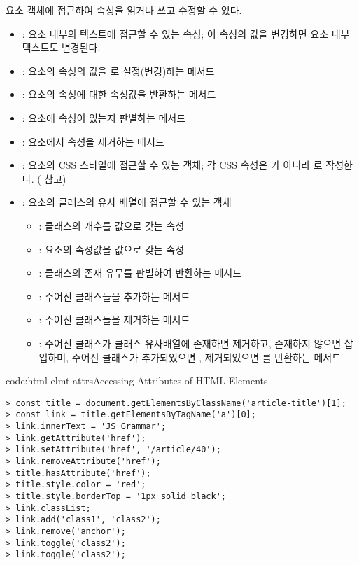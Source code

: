 요소 객체에 접근하여 속성을 읽거나 쓰고 수정할 수 있다.

\begin{itemize}
    \item {}: 요소 내부의 텍스트에 접근할 수 있는 속성; 이 속성의 값을 변경하면 요소 내부 텍스트도 변경된다.
    \item {}: 요소의  속성의 값을 로 설정(변경)하는 메서드
    \item {}: 요소의  속성에 대한 속성값을 반환하는 메서드
    \item {}: 요소에  속성이 있는지 판별하는 메서드
    \item {}: 요소에서  속성을 제거하는 메서드
    \item {}: 요소의 CSS 스타일에 접근할 수 있는 객체; 각 CSS 속성은 가 아니라 로 작성한다. ( 참고)
    \item {}: 요소의 클래스의 유사 배열에 접근할 수 있는 객체
    \begin{itemize}
        \item {}: 클래스의 개수를 값으로 갖는 속성
        \item {}: 요소의  속성값을 값으로 갖는 속성
        \item {}: 클래스의 존재 유무를 판별하여 반환하는 메서드
        \item {}: 주어진 클래스들을 추가하는 메서드
        \item {}: 주어진 클래스들을 제거하는 메서드
        \item {}: 주어진 클래스가 클래스 유사배열에 존재하면 제거하고, 존재하지 않으면 삽입하며, 주어진 클래스가 추가되었으면 , 제거되었으면 를 반환하는 메서드
    \end{itemize}
\end{itemize}

\begin{codeenv}{code:html-elmt-attrs}{Accessing Attributes of HTML Elements}\begin{verbatim}
> const title = document.getElementsByClassName('article-title')[1];
> const link = title.getElementsByTagName('a')[0];
> link.innerText = 'JS Grammar';
> link.getAttribute('href');
> link.setAttribute('href', '/article/40');
> link.removeAttribute('href');
> title.hasAttribute('href');
> title.style.color = 'red';
> title.style.borderTop = '1px solid black';
> link.classList;
> link.add('class1', 'class2');
> link.remove('anchor');
> link.toggle('class2');
> link.toggle('class2');
\end{verbatim}
\end{codeenv}

